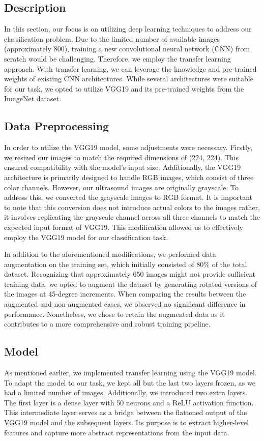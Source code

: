 \subsection{Description}
In this section, our focus is on utilizing deep learning techniques to address our classification problem. Due to the limited number of available images (approximately 800), training a new convolutional neural network (CNN) from scratch would be challenging. Therefore, we employ the transfer learning approach. With transfer learning, we can leverage the knowledge and pre-trained weights of existing CNN architectures. While several architectures were suitable for our task, we opted to utilize VGG19 and its pre-trained weights from the ImageNet dataset.

\subsection{Data Preprocessing}
In order to utilize the VGG19 model, some adjustments were necessary. Firstly, we resized our images to match the required dimensions of (224, 224). This ensured compatibility with the model's input size. Additionally, the VGG19 architecture is primarily designed to handle RGB images, which consist of three color channels. However, our ultrasound images are originally grayscale. To address this, we converted the grayscale images to RGB format. It is important to note that this conversion does not introduce actual colors to the images rather, it involves replicating the grayscale channel across all three channels to match the expected input format of VGG19. This modification allowed us to effectively employ the VGG19 model for our classification task.

In addition to the aforementioned modifications, we performed data augmentation on the training set, which initially consisted of $80\%$ of the total dataset. Recognizing that approximately 650 images might not provide sufficient training data, we opted to augment the dataset by generating rotated versions of the images at 45-degree increments. When comparing the results between the augmented and non-augmented cases, we observed no significant difference in performance. Nonetheless, we chose to retain the augmented data as it contributes to a more comprehensive and robust training pipeline.

\subsection{Model}
As mentioned earlier, we implemented transfer learning using the VGG19 model. To adapt the model to our task, we kept all but the last two layers frozen, as we had a limited number of images. Additionally, we introduced two extra layers. The first layer is a dense layer with 50 neurons and a ReLU activation function. This intermediate layer serves as a bridge between the flattened output of the VGG19 model and the subsequent layers. Its purpose is to extract higher-level features and capture more abstract representations from the input data.

